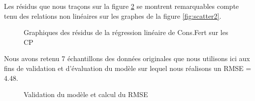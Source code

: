 	Les résidus que nous traçons sur la figure \ref{fig:residuals} se montrent remarquables compte tenu des relations non linéaires sur les graphes de la figure \ref{fig:scatter2}.
						\begin{figure}[H]
							    		\centering
							    		\caption{Graphiques des résidus de la régression linéaire de Cons.Fert sur les CP}
							    		\label{fig:residuals}
						\end{figure}
	Nous avons retenu 7 échantillons des données originales que nous utilisons ici aux fins de validation et d'évaluation du modèle sur lequel nous réalisons un RMSE = 4.48.
							\begin{figure}[H]
								    		\centering
								    		\caption{Validation du modèle et calcul du RMSE}
								    		\label{fig:residuals}
							\end{figure}
